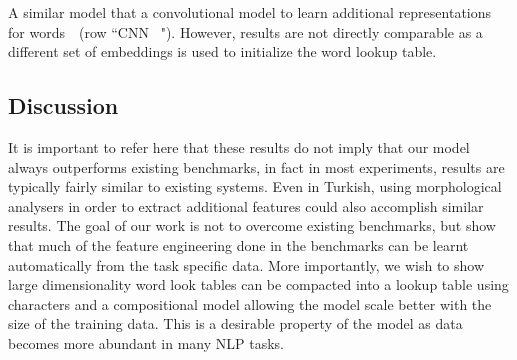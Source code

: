 \documentclass[11pt]{article}
\begin{document}
\begin{CJK*}{UTF8}{gbsn}
A similar model that a convolutional model to learn additional representations for words~\cite{icml2014c2_santos14}~(row ``CNN~
\cite{icml2014c2_santos14}"). However, results are not directly comparable as a different set of embeddings is used to initialize the word lookup table.




\begin{table}
\begin{center}
\end{center}
\caption{\label{wsjstate} POS accuracy result comparison with state-of-the-art systems for the English PTB.}
\end{table}

\subsection{Discussion}

It is important to refer here that these results do not imply that our model always outperforms existing benchmarks, in fact in most experiments, results are typically fairly similar to existing systems. Even in Turkish, using morphological analysers in order to extract additional features could also accomplish similar results. The goal of our work is not to overcome existing benchmarks, but show that much of the feature engineering done in the benchmarks can be learnt automatically from the task specific data. More importantly, we wish to show large dimensionality word look tables can be compacted into a lookup table using characters and a compositional model allowing the model scale better with the size of the training data. This is a desirable property of the model as data becomes more abundant in many NLP tasks. 


\end{CJK*}
\end{document}
